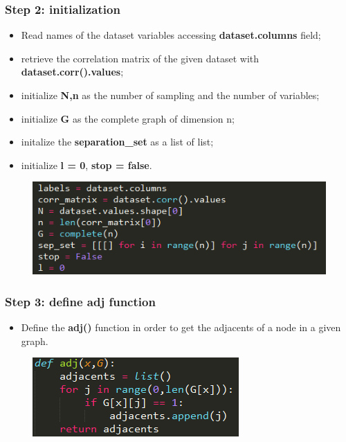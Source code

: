 \documentclass[xcolor ={table,usenames,dvipsnames}]{beamer}
\theoremstyle{definition}
\begin{document}
	\begin{frame}
\frametitle{Step 2: initialization}
\begin{itemize}
	\item Read names of the dataset variables accessing \textbf{dataset.columns} field;
	\item retrieve the correlation matrix of the given dataset with \textbf{dataset.corr().values};
	\item initialize \textbf{N,n} as the number of sampling and the number of variables;
	\item initialize \textbf{G} as the complete graph of dimension n;
	\item initalize the \textbf{separation\_set} as a list of list;
	\item initialize \textbf{l = 0}, \textbf{stop = false}.
\end{itemize}
	\begin{figure}[h!]
		\centering
		\includegraphics[scale=0.52]{img/initialization.PNG}
	\end{figure}

\end{frame}
\begin{frame}
\frametitle{Step 3: define adj function}
\begin{itemize}
	\item Define the \textbf{adj()} function in order to get the adjacents of a node in a given graph.
\end{itemize}
	\begin{figure}[h!]
		\centering
		\includegraphics[scale=0.9]{img/adj.PNG}
	\end{figure}

\end{frame}
\end{document}
